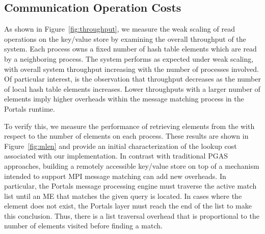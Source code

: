 \subsection{Communication Operation Costs}


As shown in Figure~\ref{fig:throughput}, we measure the weak scaling
of \pdht read operations on the key/value store by examining the
overall throughput of the system. Each process owns a fixed number of
hash table elements which are read by a neighboring process. The
system performs as expected under weak scaling, with overall system
throughput increasing with the number of processes involved. Of
particular interest, is the observation that throughput decreases as
the number of local hash table elements increases. Lower throughputs
with a larger number of elements imply higher overheads
within the message matching process in the Portals runtime.

To verify this, we measure the performance of retrieving elements from
the \pdht with respect to the number of elements on each process.
These results are shown in Figure~\ref{fig:mlen} and provide an
initial characterization of the lookup cost associated with our \pdht
implementation.  In contrast with traditional PGAS approaches,
building a remotely accessible key/value store on top of a mechanism
intended to support MPI message matching can add new overheads.  In
particular, the Portals message processing engine must traverse the
active match list until an ME that matches the given query is located.
In cases where the element does not exist, the Portals layer must
reach the end of the list to make this conclusion.  Thus, there is a
list traversal overhead that is proportional to the number of elements
visited before finding a match.










